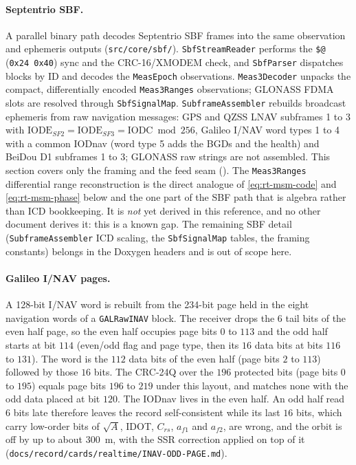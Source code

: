 \documentclass[main.tex]{subfiles}
\begin{document}
\paragraph{Septentrio SBF.}
A parallel binary path decodes Septentrio SBF frames into the same
observation and ephemeris outputs (\texttt{src/core/sbf/}).
\texttt{SbfStreamReader} performs the \texttt{\$@} (\texttt{0x24\,0x40})
sync and the CRC-16/XMODEM check, and \texttt{SbfParser} dispatches
blocks by ID and decodes the \texttt{MeasEpoch} observations.
\texttt{Meas3Decoder} unpacks the compact, differentially encoded
\texttt{Meas3Ranges} observations; GLONASS FDMA slots are resolved
through \texttt{SbfSignalMap}.  \texttt{SubframeAssembler} rebuilds
broadcast ephemeris from raw navigation messages: GPS and QZSS LNAV
subframes 1 to 3 with $\mathrm{IODE}_{SF2} = \mathrm{IODE}_{SF3} =
\mathrm{IODC} \bmod 256$, Galileo I/NAV word types 1 to 4 with a common
IODnav (word type 5 adds the BGDs and the health) and BeiDou D1 subframes 1
to 3; GLONASS raw strings are not assembled.  This section covers only the
framing and the feed seam ().  The
\texttt{Meas3Ranges} differential range reconstruction is the direct
analogue of \eqref{eq:rt-msm-code} and \eqref{eq:rt-msm-phase} below and
the one part of the SBF path that is algebra rather than ICD
bookkeeping.  It is \emph{not} yet derived in this reference, and no
other document derives it: this is a known gap.  The remaining SBF detail
(\texttt{SubframeAssembler} ICD scaling, the \texttt{SbfSignalMap}
tables, the framing constants) belongs in the Doxygen headers and is out
of scope here.

\paragraph{Galileo I/NAV pages.}
A 128-bit I/NAV word is rebuilt from the 234-bit page held in the eight
navigation words of a \texttt{GALRawINAV} block.  The receiver drops the 6 tail
bits of the even half page, so the even half occupies page bits $0$ to $113$
and the odd half starts at bit $114$ (even/odd flag and page type, then its $16$
data bits at bits $116$ to $131$).  The word is the $112$ data bits of the even
half (page bits $2$ to $113$) followed by those $16$ bits.  The CRC-24Q over
the $196$ protected bits (page bits $0$ to $195$) equals page bits $196$ to
$219$ under this layout, and matches none with the odd data placed at bit
$120$.  The IODnav lives in the even half.  An odd half read $6$ bits late
therefore leaves the record self-consistent while its last $16$ bits, which
carry low-order bits of $\sqrt{A}$, IDOT, $C_{rs}$, $a_{f1}$ and $a_{f2}$, are
wrong, and the orbit is off by up to about \SI{300}{\metre}, with the SSR
correction applied on top of it
(\texttt{docs/record/cards/realtime/INAV-ODD-PAGE.md}).
\end{document}
